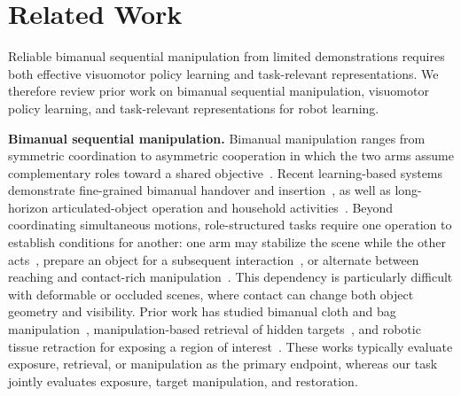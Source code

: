 \section{Related Work}
\label{sec:relatedwork}
Reliable bimanual sequential manipulation from limited demonstrations requires
both effective visuomotor policy learning and task-relevant representations.
We therefore review prior work on bimanual sequential manipulation,
visuomotor policy learning, and task-relevant representations for robot learning.

\noindent\textbf{Bimanual sequential manipulation.}
Bimanual manipulation ranges from symmetric coordination to asymmetric cooperation
in which the two arms assume complementary roles toward a shared objective~\cite{smith2012dual,krebs2022taxonomy}.
Recent learning-based systems demonstrate fine-grained bimanual handover and insertion~\cite{zhao2023act,zhou2025yoto},
as well as long-horizon articulated-object operation and household activities~\cite{fu2024mobilealoha,chi2024umi}.
Beyond coordinating simultaneous motions, role-structured tasks require one operation to establish conditions for another:
one arm may stabilize the scene while the other acts~\cite{grannen2023stabilize},
prepare an object for a subsequent interaction~\cite{wan2020preparatory,shen2026bipremanip},
or alternate between reaching and contact-rich manipulation~\cite{kim2024dualaction}.
This dependency is particularly difficult with deformable or occluded scenes,
where contact can change both object geometry and visibility.
Prior work has studied bimanual cloth and bag manipulation~\cite{weng2022fabricflownet,zhou2025bag},
manipulation-based retrieval of hidden targets~\cite{dogar2014search,danielczuk2019mechanical},
and robotic tissue retraction for exposing a region of interest~\cite{attanasio2020retraction,pore2021retraction}.
These works typically evaluate exposure, retrieval, or manipulation as the primary endpoint, whereas our task jointly evaluates exposure, target manipulation, and restoration.

